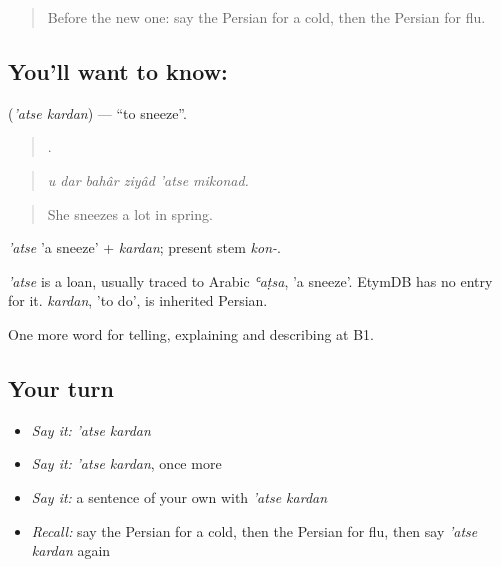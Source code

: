 \label{lesson:FA-C490-atse-kardan}



\begin{quote}
Before the new one: say the Persian for a cold, then the Persian for flu.
\end{quote}

\subsection*{You'll want to know:  }
\textbf{ } (\emph{'atse kardan}) — \textquotedblleft{}to sneeze\textquotedblright{}.

\begin{quote}
     .
\end{quote}

\begin{quote}
\emph{u dar bahâr ziyâd 'atse mikonad.}
\end{quote}

\begin{quote}
She sneezes a lot in spring.
\end{quote}

\emph{'atse} 'a sneeze' + \emph{kardan}; present stem \emph{kon-}.

\begin{cousinweb}
\emph{'atse} is a loan, usually traced to Arabic \emph{ʿaṭsa}, 'a sneeze'. EtymDB has no entry for it. \emph{kardan}, 'to do', is inherited Persian.
\end{cousinweb}

\begin{grammarlens}[title={What you've built}]
One more word for telling, explaining and describing at B1.
\end{grammarlens}

\subsection*{Your turn}
\begin{itemize}
\raggedright
  \item \emph{Say it:} \emph{'atse kardan}
  \item \emph{Say it:} \emph{'atse kardan}, once more
  \item \emph{Say it:} a sentence of your own with \emph{'atse kardan}
  \item \emph{Recall:} say the Persian for a cold, then the Persian for flu, then say \emph{'atse kardan} again
\end{itemize}

